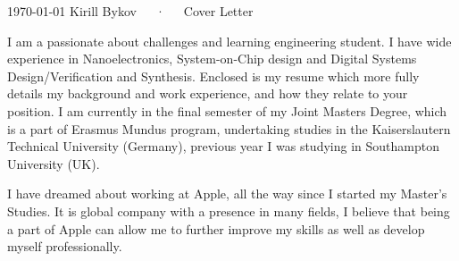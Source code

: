 \documentclass[11pt, a4paper]{awesome-cv}
\begin{document}
\makecvheader[R]

\makecvfooter
  {\today}
  {Kirill Bykov~~~·~~~Cover Letter}
  {}

\makelettertitle

\begin{cvletter}

I am a passionate about challenges and learning engineering student. I have wide experience in Nanoelectronics, System-on-Chip design and Digital Systems Design/Verification and Synthesis. Enclosed is my resume which more fully details my background and work experience, and how they relate to your position. I am currently in the final semester of my Joint Masters Degree, which is a part of Erasmus Mundus program, undertaking studies in the Kaiserslautern Technical University (Germany), previous year I was studying in Southampton University (UK).

I have dreamed about working at Apple, all the way since I started my Master's Studies. It is global company with a presence in many fields, I believe that being a part of Apple can allow me to further improve my skills as well as develop myself professionally.


\end{cvletter}
\end{document}
